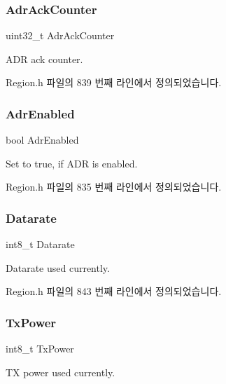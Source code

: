 \subsubsection{\texorpdfstring{Adr\+Ack\+Counter}{AdrAckCounter}}
{\footnotesize\ttfamily uint32\+\_\+t Adr\+Ack\+Counter}

A\+DR ack counter. 

Region.\+h 파일의 839 번째 라인에서 정의되었습니다.

\mbox{\label{structs_adr_next_params_ab3e2fb44577c95786e11aacd56769703}} 
\subsubsection{\texorpdfstring{Adr\+Enabled}{AdrEnabled}}
{\footnotesize\ttfamily bool Adr\+Enabled}

Set to true, if A\+DR is enabled. 

Region.\+h 파일의 835 번째 라인에서 정의되었습니다.

\mbox{\label{structs_adr_next_params_ae2f6080f3aa0e9485c55513ca56bb24d}} 
\subsubsection{\texorpdfstring{Datarate}{Datarate}}
{\footnotesize\ttfamily int8\+\_\+t Datarate}

Datarate used currently. 

Region.\+h 파일의 843 번째 라인에서 정의되었습니다.

\mbox{\label{structs_adr_next_params_a037b4f849fa8ed4aa1d3c58aef2b28ec}} 
\subsubsection{\texorpdfstring{Tx\+Power}{TxPower}}
{\footnotesize\ttfamily int8\+\_\+t Tx\+Power}

TX power used currently. 

